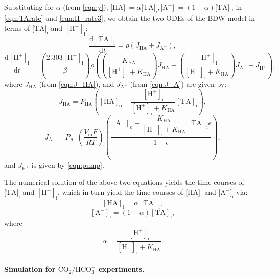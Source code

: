 \documentclass[fleqn,10pt]{physiome}
\begin{document}
Substituting for $\alpha$ (from \autoref{eqn:y}), $[\mathrm{HA]_i} = \alpha [\mathrm{TA]_i}, [\mathrm{A^-]_i} = (1-\alpha) [\mathrm{TA]_i}$, in \autoref{eqn:TArate} and \autoref{eqn:H_rate3}, we obtain the two ODEs of the BDW model in terms of $[\mathrm{TA]_i}$ and $\mathrm{[H^+]_i}$:
\begin{equation}
\dfrac{\mathrm{d[TA]_i}}{\mathrm{d}t}=\rho\left(J_\mathrm{HA}+J_\mathrm{A^-}\right),
\label{eqn:TA_rate_final}
\end{equation}
\begin{equation}
\dfrac{\mathrm{d[H^+]_i}}{\mathrm{d}t}=\left(\dfrac{2.303\mathrm{[H^+]_i}}{\beta}\right)\rho\left(\left(\dfrac{K_\mathrm{HA}}{\mathrm{[H^+]_i}+K_\mathrm{HA}}\right)J_\mathrm{HA}-\left(\dfrac{\mathrm{[H^+]_i}}{\mathrm{[H^+]_i}+K_\mathrm{HA}}\right)J_\mathrm{A^-}-J_\mathrm{H^+} \right),
\label{eqn:H_rate_final}
\end{equation}
where $J_\mathrm{HA}$ (from \autoref{eqn:J_HA}), and $J_\mathrm{A^-}$ (from \autoref{eqn:J_A}) are given by:
\begin{equation*}
J_\mathrm{HA}=P_\mathrm{HA}\left( \mathrm{[HA]_o}-\dfrac{\mathrm{[H^+]_i}}{\mathrm{[H^+]_i}+K_\mathrm{{HA}}}\mathrm{[TA]_i} \right),
\end{equation*}
\begin{equation*}
J_\mathrm{A^-}=P_\mathrm{A^-}\left(\dfrac{V_\mathrm{m}F}{RT}\right)\left(\dfrac{\mathrm{[A^-]_o}-\dfrac{K_\mathrm{HA}}{\mathrm{[H^+]_i}+K_\mathrm{HA}}\mathrm{[TA]_i} \epsilon}{1-\epsilon}\right),
\end{equation*}
and $J_\mathrm{H^+}$ is given by \autoref{eqn:pump}.

The numerical solution of the above two equations yields the time courses of $[\mathrm{TA]_i}$ and $\mathrm{[H^+]_i}$, which in turn yield the time-courses of $[\mathrm{HA]_i}$ and $[\mathrm{A^-]_i}$ via:
\begin{equation}
\mathrm{[HA]_i}=\alpha\mathrm{[TA]_i},
\end{equation}
\begin{equation}
\mathrm{[A^-]_i}=(1-\alpha)\mathrm{[TA]_i},
\end{equation}
where
\begin{equation}
\alpha=\dfrac{\mathrm{[H^+]_i}}{\mathrm{[H^+]_i}+K_\mathrm{HA}}.
\label{eqn:alpha}
\end{equation}

\paragraph{Simulation for $\mathrm{CO_2}/\mathrm{HCO_3^-}$ experiments.}
\end{document}
